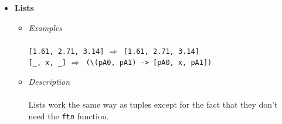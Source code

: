 \documentclass{article}
\def\lra{$\Longrightarrow$\ }
\def\pend{\mbox{}\\\\}
\begin{document}
\begin{itemize}
\begin{itemize}
\paragraph{Parameters for the underscores}\pend
If any of the fields of the tuples contain underscores, we generate a new
parameter name  in place every underscore ("\texttt{pA\textit{<n - 1>}}" for
the n-th underscore) and at the end we prepend the parameters to make it a
function expression. "pA" stands for parameter and the A is uppercase to avoid
collisions with regular identifiers.

\paragraph{Big Tuples}\pend
For big tuples, the original lines are kept and split in the same way.
The \texttt{ft\textit{n}} function and the implicitly introduced parameters
have their own seperate lines at the top as shown in the following example:
\begin{verbatim}
( "Hey, I'm the first field and I'm also a pretty big string."
, "Hey, I'm the second field and I'm a smaller string."
, _
)
\end{verbatim}
Becomes:
\begin{verbatim}
\pA0 ->
ft3
( "Hey, I'm the first field and I'm also a pretty big string."
, "Hey, I'm the second field and I'm a smaller string"
, pA0
)
\end{verbatim}
All of these lines are also indented to the same column according to the
indentation level.

\end{itemize}

\item
\textbf{Lists}

\begin{itemize}
\item
\textit{Examples}\\\\
\texttt{[1.61, 2.71, 3.14]} \lra \texttt{[1.61, 2.71, 3.14]} \\
\verb|[_, x, _]| \lra \verb|(\(pA0, pA1) -> [pA0, x, pA1])| \\

\item
\textit{Description}\\\\
Lists work the same way as tuples except for the fact that they don't need
the \texttt{ft\textit{n}} function.

\end{itemize}

\end{itemize}
\end{document}
